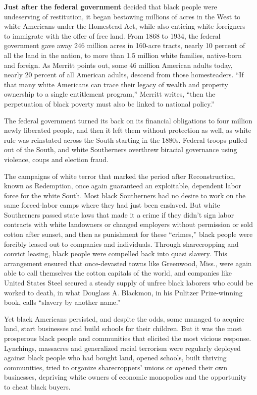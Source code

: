 \textbf{Just after the federal government} decided that black people
were undeserving of restitution, it began bestowing millions of acres in
the West to white Americans under the Homestead Act, while also enticing
white foreigners to immigrate with the offer of free land. From 1868 to
1934, the federal government gave away 246 million acres in 160-acre
tracts, nearly 10 percent of all the land in the nation, to more than
1.5 million white families, native-born and foreign. As Merritt points
out, some 46 million American adults today, nearly 20 percent of all
American adults, descend from those homesteaders. ``If that many white
Americans can trace their legacy of wealth and property ownership to a
single entitlement program,'' Merritt writes, ``then the perpetuation of
black poverty must also be linked to national policy.''

The federal government turned its back on its financial obligations to
four million newly liberated people, and then it left them without
protection as well, as white rule was reinstated across the South
starting in the 1880s. Federal troops pulled out of the South, and white
Southerners overthrew biracial governance using violence, coups and
election fraud.

The campaigns of white terror that marked the period after
Reconstruction, known as Redemption, once again guaranteed an
exploitable, dependent labor force for the white South. Most black
Southerners had no desire to work on the same forced-labor camps where
they had just been enslaved. But white Southerners passed state laws
that made it a crime if they didn't sign labor contracts with white
landowners or changed employers without permission or sold cotton after
sunset, and then as punishment for these ``crimes,'' black people were
forcibly leased out to companies and individuals. Through sharecropping
and convict leasing, black people were compelled back into quasi
slavery. This arrangement ensured that once-devasted towns like
Greenwood, Miss., were again able to call themselves the cotton capitals
of the world, and companies like United States Steel secured a steady
supply of unfree black laborers who could be worked to death, in what
Douglass A. Blackmon, in his Pulitzer Prize-winning book, calls
``slavery by another name.''

Yet black Americans persisted, and despite the odds, some managed to
acquire land, start businesses and build schools for their children. But
it was the most prosperous black people and communities that elicited
the most vicious response. Lynchings, massacres and generalized racial
terrorism were regularly deployed against black people who had bought
land, opened schools, built thriving communities, tried to organize
sharecroppers' unions or opened their own businesses, depriving white
owners of economic monopolies and the opportunity to cheat black buyers.

